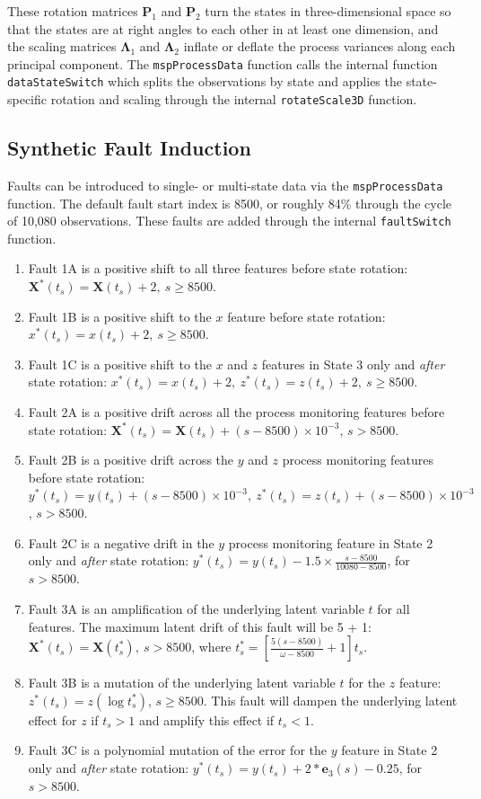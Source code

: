 \documentclass{report}\usepackage[]{graphicx}\usepackage[]{color}
\begin{document}
These rotation matrices $\textbf{P}_1$ and $\textbf{P}_2$ turn the states in three-dimensional space so that the states are at right angles to each other in at least one dimension, and the scaling matrices $\boldsymbol\Lambda_1$ and $\boldsymbol\Lambda_2$ inflate or deflate the process variances along each principal component. The \texttt{mspProcessData} function calls the internal function \texttt{dataStateSwitch} which splits the observations by state and applies the state-specific rotation and scaling through the internal \texttt{rotateScale3D} function.


\subsection{Synthetic Fault Induction} \label{subsec:D_FaultDefns}
Faults can be introduced to single- or multi-state data via the \texttt{mspProcessData} function. The default fault start index is 8500, or roughly 84\% through the cycle of 10,080 observations. These faults are added through the internal \texttt{faultSwitch} function.
\begin{enumerate}
\item Fault 1A is a positive shift to all three features before state rotation: $\textbf{X}^*(t_s) = \textbf{X}(t_s) + 2,\ s \ge 8500$.
%
\item Fault 1B is a positive shift to the $x$ feature before state rotation: $x^*(t_s) = x(t_s) + 2,\ s \ge 8500$.
%
\item Fault 1C is a positive shift to the $x$ and $z$ features in State 3 only and \emph{after} state rotation: $x^*(t_s) = x(t_s) + 2,\ z^*(t_s) = z(t_s) + 2,\ s \ge 8500$.
%
\item Fault 2A is a positive drift across all the process monitoring features before state rotation: $\textbf{X}^*(t_s) = \textbf{X}(t_s) + (s - 8500)\times 10^{-3}$, $s > 8500$.
%
\item Fault 2B is a positive drift across the $y$ and $z$ process monitoring features before state rotation: $y^*(t_s) = y(t_s) + (s - 8500)\times 10^{-3},\ z^*(t_s) = z(t_s) + (s - 8500)\times 10^{-3}$, $s > 8500$.
%
\item Fault 2C is a negative drift in the $y$ process monitoring feature in State 2 only and \emph{after} state rotation: $y^*(t_s) = y(t_s) - 1.5 \times \frac{s - 8500}{10080 - 8500}$, for $s > 8500$.
%
\item Fault 3A is an amplification of the underlying latent variable $t$ for all features. The maximum latent drift of this fault will be 5 + 1: $\textbf{X}^*(t_s) = \textbf{X}(t_s^*),\ s > 8500$, where $t_s^* = \left[\frac{5(s - 8500)}{\omega - 8500} + 1\right]t_s$.
%
\item Fault 3B is a mutation of the underlying latent variable $t$ for the $z$ feature: $z^*(t_s) = z(\log t_s^*)$, $s \ge 8500$. This fault will dampen the underlying latent effect for $z$ if $t_s > 1$ and amplify this effect if $t_s < 1$.
%
\item Fault 3C is a polynomial mutation of the error for the $y$ feature in State 2 only and \emph{after} state rotation: $y^*(t_s) = y(t_s) + 2 * \textbf{e}_3(s) - 0.25$, for $s > 8500$.
\end{enumerate}
\end{document}
